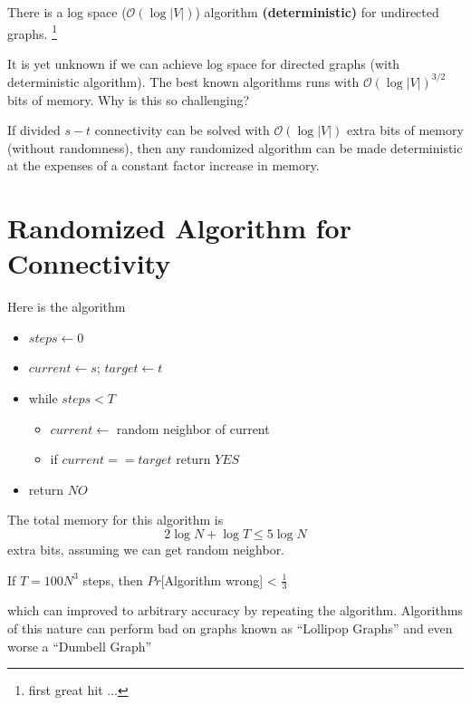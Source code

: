 \documentclass[11pt, letter]{book}
\begin{document}
\begin{proposition}
	There is a log space ($\mathcal O ( \log | V | )$) algorithm \textbf{(deterministic)} for undirected graphs. \footnote{first great hit ...}
\end{proposition}

It is yet unknown if we can achieve log space for directed graphs (with deterministic algorithm). The best known algorithms runs with $\mathcal O (\log |V| ) ^{3/2}$ bits of memory. Why is this so challenging? 

\begin{proposition}
	If divided $s-t$ connectivity can be solved with $\mathcal O (\log |V| )$ extra bits of memory (without randomness), then any randomized algorithm can be made deterministic at the expenses of a constant factor increase in memory. 
\end{proposition}

\section{Randomized Algorithm for Connectivity}
\begin{algorithm} Here is the algorithm
	\begin{itemize}
		\item $steps \gets 0 $ 
		\item $current \gets s$; $target \gets t$
		\item while $steps < T$
		\begin{itemize}
			\item $current \gets $ random neighbor of current
			\item if $current == target$ return $YES$
		\end{itemize}
		\item return $NO$
	\end{itemize}
\end{algorithm}
The total memory for this algorithm is 
\begin{equation}
	2 \log N + \log T \leq 5 \log N
\end{equation}
extra bits, assuming we can get random neighbor. 

\begin{proposition}[Alenilaus, 80s]
	If $T = 100N^3$ steps, then $Pr$[Algorithm wrong] < $\frac{1}{3}$
\end{proposition}
which can improved to arbitrary accuracy by repeating the algorithm. Algorithms of this nature can perform bad on graphs known as ``Lollipop Graphs'' and even worse a ``Dumbell Graph''
\end{document}
